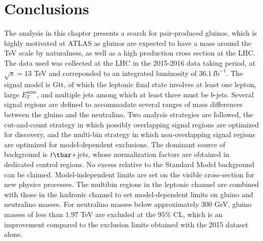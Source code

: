 \section{Conclusions}\label{mb:conc}

The analysis in this chapter presents a search for pair-produced gluinos, which
is highly motivated at ATLAS as gluinos are expected to have a mass around the
TeV scale by naturalness, as well as a high production cross section at the
LHC. The data used was collected at the LHC in the 2015-2016 data taking
period, at $\sqrt{s}=13$ TeV and correponded to an integrated luminosity of
$36.1~\text{fb}^{-1}$. The signal model is Gtt, of which the leptonic final
state involves at least one lepton, large $E_{T}^{\text{miss}}$, and multiple
jets among which at least three must be $b$-jets. Several signal regions are
defined to accommodate several ranges of mass differences between the gluino
and the neutralino. Two analysis strategies are followed, the cut-and-count
strategy in which possibly overlapping signal regions are optimized for
discovery, and the multi-bin strategy in which non-overlapping signal regions
are optimized for model-dependent exclusions. The dominant source of background
is $t\tbar+$jets, whose normalization factors are obtained in dedicated control
regions. No excess relative to the Standard Model background can be claimed.
Model-independent limits are set on the visible cross-section for new physics
processes. The multibin regions in the leptonic channel are combined with those
in the hadronic channel to set model-dependent limits on gluino and neutralino
masses. For neutralino masses below approximately $300$ GeV, gluino masses of
less than $1.97$ TeV are excluded at the $95\%$ CL, which is an improvement
compared to the exclusion limits obtained with the 2015 dataset alone.

